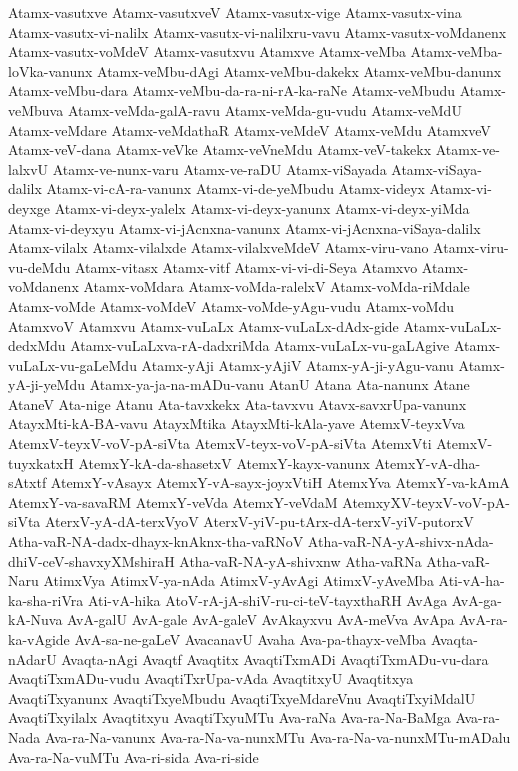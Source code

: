 {Atamx-vasutxve
Atamx-vasutxveV
Atamx-vasutx-vige
Atamx-vasutx-vina
Atamx-vasutx-vi-nalilx
Atamx-vasutx-vi-nalilxru-vavu
Atamx-vasutx-voMdanenx
Atamx-vasutx-voMdeV
Atamx-vasutxvu
Atamxve
Atamx-veMba
Atamx-veMba-loVka-vanunx
Atamx-veMbu-dAgi
Atamx-veMbu-dakekx
Atamx-veMbu-danunx
Atamx-veMbu-dara
Atamx-veMbu-da-ra-ni-rA-ka-raNe
Atamx-veMbudu
Atamx-veMbuva
Atamx-veMda-galA-ravu
Atamx-veMda-gu-vudu
Atamx-veMdU
Atamx-veMdare
Atamx-veMdathaR
Atamx-veMdeV
Atamx-veMdu
AtamxveV
Atamx-veV-dana
Atamx-veVke
Atamx-veVneMdu
Atamx-veV-takekx
Atamx-ve-lalxvU
Atamx-ve-nunx-varu
Atamx-ve-raDU
Atamx-viSayada
Atamx-viSaya-dalilx
Atamx-vi-cA-ra-vanunx
Atamx-vi-de-yeMbudu
Atamx-videyx
Atamx-vi-deyxge
Atamx-vi-deyx-yalelx
Atamx-vi-deyx-yanunx
Atamx-vi-deyx-yiMda
Atamx-vi-deyxyu
Atamx-vi-jAcnxna-vanunx
Atamx-vi-jAcnxna-viSaya-dalilx
Atamx-vilalx
Atamx-vilalxde
Atamx-vilalxveMdeV
Atamx-viru-vano
Atamx-viru-vu-deMdu
Atamx-vitasx
Atamx-vitf
Atamx-vi-vi-di-Seya
Atamxvo
Atamx-voMdanenx
Atamx-voMdara
Atamx-voMda-ralelxV
Atamx-voMda-riMdale
Atamx-voMde
Atamx-voMdeV
Atamx-voMde-yAgu-vudu
Atamx-voMdu
AtamxvoV
Atamxvu
Atamx-vuLaLx
Atamx-vuLaLx-dAdx-gide
Atamx-vuLaLx-dedxMdu
Atamx-vuLaLxva-rA-dadxriMda
Atamx-vuLaLx-vu-gaLAgive
Atamx-vuLaLx-vu-gaLeMdu
Atamx-yAji
Atamx-yAjiV
Atamx-yA-ji-yAgu-vanu
Atamx-yA-ji-yeMdu
Atamx-ya-ja-na-mADu-vanu
AtanU
Atana
Ata-nanunx
Atane
AtaneV
Ata-nige
Atanu
Ata-tavxkekx
Ata-tavxvu
Atavx-savxrUpa-vanunx
AtayxMti-kA-BA-vavu
AtayxMtika
AtayxMti-kAla-yave
AtemxV-teyxVva
AtemxV-teyxV-voV-pA-siVta
AtemxV-teyx-voV-pA-siVta
AtemxVti
AtemxV-tuyxkatxH
AtemxY-kA-da-shasetxV
AtemxY-kayx-vanunx
AtemxY-vA-dha-sAtxtf
AtemxY-vAsayx
AtemxY-vA-sayx-joyxVtiH
AtemxYva
AtemxY-va-kAmA
AtemxY-va-savaRM
AtemxY-veVda
AtemxY-veVdaM
AtemxyXV-teyxV-voV-pA-siVta
AterxV-yA-dA-terxVyoV
AterxV-yiV-pu-tArx-dA-terxV-yiV-putorxV
Atha-vaR-NA-dadx-dhayx-knAknx-tha-vaRNoV
Atha-vaR-NA-yA-shivx-nAda-dhiV-ceV-shavxyXMshiraH
Atha-vaR-NA-yA-shivxnw
Atha-vaRNa
Atha-vaR-Naru
AtimxVya
AtimxV-ya-nAda
AtimxV-yAvAgi
AtimxV-yAveMba
Ati-vA-ha-ka-sha-riVra
Ati-vA-hika
AtoV-rA-jA-shiV-ru-ci-teV-tayxthaRH
AvAga
AvA-ga-kA-Nuva
AvA-galU
AvA-gale
AvA-galeV
AvAkayxvu
AvA-meVva
AvApa
AvA-ra-ka-vAgide
AvA-sa-ne-gaLeV
AvacanavU
Avaha
Ava-pa-thayx-veMba
Avaqta-nAdarU
Avaqta-nAgi
Avaqtf
Avaqtitx
AvaqtiTxmADi
AvaqtiTxmADu-vu-dara
AvaqtiTxmADu-vudu
AvaqtiTxrUpa-vAda
AvaqtitxyU
Avaqtitxya
AvaqtiTxyanunx
AvaqtiTxyeMbudu
AvaqtiTxyeMdareVnu
AvaqtiTxyiMdalU
AvaqtiTxyilalx
Avaqtitxyu
AvaqtiTxyuMTu
Ava-raNa
Ava-ra-Na-BaMga
Ava-ra-Nada
Ava-ra-Na-vanunx
Ava-ra-Na-va-nunxMTu
Ava-ra-Na-va-nunxMTu-mADalu
Ava-ra-Na-vuMTu
Ava-ri-sida
Ava-ri-side
}
